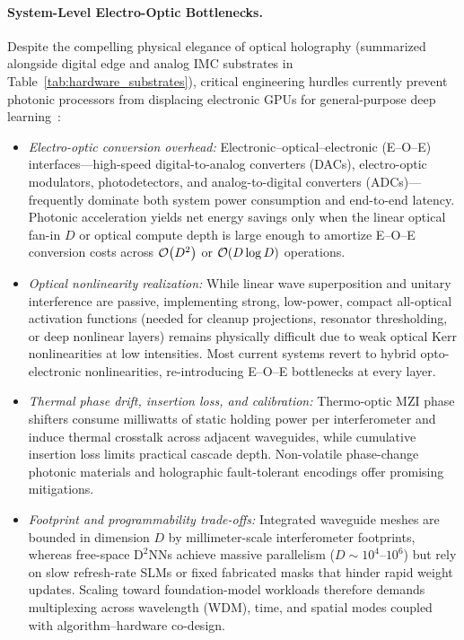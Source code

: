 \paragraph{System-Level Electro-Optic Bottlenecks.}
Despite the compelling physical elegance of optical holography (summarized alongside digital edge and analog IMC substrates in Table~\ref{tab:hardware_substrates}), critical engineering hurdles currently prevent photonic processors from displacing electronic GPUs for general-purpose deep learning~\cite{WETZSTEIN_2020_OPTICAL_AI,MCMAHON_2023_PHYSICS_OPTICAL_NN}:
\begin{itemize}
    \item \emph{Electro-optic conversion overhead:} Electronic--optical--electronic (E--O--E) interfaces---high-speed digital-to-analog converters (DACs), electro-optic modulators, photodetectors, and analog-to-digital converters (ADCs)---frequently dominate both system power consumption and end-to-end latency. Photonic acceleration yields net energy savings only when the linear optical fan-in $D$ or optical compute depth is large enough to amortize E--O--E conversion costs across $\mathcal{O}\!\left(D^2\right)$ or $\mathcal{O}\!\left(D \log D\right)$ operations.
    \item \emph{Optical nonlinearity realization:} While linear wave superposition and unitary interference are passive, implementing strong, low-power, compact all-optical activation functions (needed for cleanup projections, resonator thresholding, or deep nonlinear layers) remains physically difficult due to weak optical Kerr nonlinearities at low intensities. Most current systems revert to hybrid opto-electronic nonlinearities, re-introducing E--O--E bottlenecks at every layer.
    \item \emph{Thermal phase drift, insertion loss, and calibration:} Thermo-optic MZI phase shifters consume milliwatts of static holding power per interferometer and induce thermal crosstalk across adjacent waveguides, while cumulative insertion loss limits practical cascade depth. Non-volatile phase-change photonic materials and holographic fault-tolerant encodings offer promising mitigations.
    \item \emph{Footprint and programmability trade-offs:} Integrated waveguide meshes are bounded in dimension $D$ by millimeter-scale interferometer footprints, whereas free-space $\text{D}^2\text{NN}$s achieve massive parallelism ($D \sim 10^4\text{--}10^6$) but rely on slow refresh-rate SLMs or fixed fabricated masks that hinder rapid weight updates. Scaling toward foundation-model workloads therefore demands multiplexing across wavelength (WDM), time, and spatial modes coupled with algorithm--hardware co-design.
\end{itemize}
